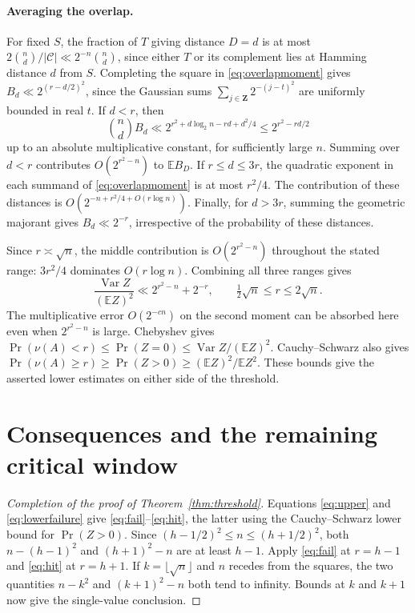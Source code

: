 \documentclass[11pt]{article}
\theoremstyle{remark}\newtheorem*{remark}{Remark}
\begin{document}
\paragraph{Averaging the overlap.}
For fixed $S$, the fraction of $T$ giving distance $D=d$ is at most
$2\binom nd/|\mathcal C|\ll 2^{-n}\binom nd$, since either $T$ or
its complement lies at Hamming distance $d$ from $S$.
Completing the square in \eqref{eq:overlapmoment} gives
$B_d\ll 2^{(r-d/2)^2}$, since the Gaussian sums
$\sum_{j\in\mathbf Z}2^{-(j-t)^2}$ are uniformly bounded in real $t$.
If $d<r$, then
\[
 \binom nd B_d\ll 2^{r^2+d\log_2n-rd+d^2/4}
       \le 2^{r^2-rd/2}
\]
up to an absolute multiplicative constant, for sufficiently large $n$.
Summing over $d<r$ contributes $O(2^{r^2-n})$ to $\mathbb E B_D$.
If $r\le d\le 3r$, the quadratic exponent in each summand of
\eqref{eq:overlapmoment} is at most $r^2/4$. The contribution of
these distances is $O(2^{-n+r^2/4+O(r\log n)})$.
Finally, for $d>3r$, summing the geometric majorant gives
$B_d\ll 2^{-r}$, irrespective of the probability of these distances.

Since $r\asymp\sqrt n$, the middle contribution is $O(2^{r^2-n})$
throughout the stated range: $3r^2/4$ dominates $O(r\log n)$.
Combining all three ranges gives
\begin{equation}\label{eq:lowerfailure}
 \frac{\operatorname{Var} Z}{(\mathbb E Z)^2}
 \ll 2^{r^2-n}+2^{-r},
 \qquad \tfrac12\sqrt n\le r\le2\sqrt n .
\end{equation}
The multiplicative error $O(2^{-c n})$ on the second moment can be
absorbed here even when $2^{r^2-n}$ is large. Chebyshev gives
$\Pr(\nu(A)<r)\le\Pr(Z=0)\le\operatorname{Var} Z/(\mathbb E Z)^2$.
Cauchy--Schwarz also gives
$\Pr(\nu(A)\ge r)\ge\Pr(Z>0)\ge(\mathbb E Z)^2/\mathbb E Z^2$.
These bounds give the asserted lower estimates on either side of the threshold.
\section{Consequences and the remaining critical window}
\begin{proof}[Completion of the proof of Theorem~\ref{thm:threshold}]
Equations \eqref{eq:upper} and \eqref{eq:lowerfailure} give \eqref{eq:fail}--\eqref{eq:hit}, the latter using the Cauchy--Schwarz lower bound for $\Pr(Z>0)$. Since $(h-1/2)^2\le n\le(h+1/2)^2$, both $n-(h-1)^2$ and $(h+1)^2-n$ are at least $h-1$. Apply \eqref{eq:fail} at $r=h-1$ and \eqref{eq:hit} at $r=h+1$. If $k=\lfloor\sqrt n\rfloor$ and $n$ recedes from the squares, the two quantities $n-k^2$ and $(k+1)^2-n$ both tend to infinity. Bounds at $k$ and $k+1$ now give the single-value conclusion.
\end{proof}
\end{document}
